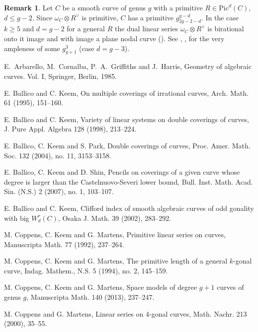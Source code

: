 \documentclass{amsart}
\theoremstyle{plain}
\theoremstyle{definition}
\newtheorem{remark}{Remark}
\begin{document}
\begin{remark}
Let $C$ be a smooth curve of genus $g$ with a primitive $R\in \mathrm{Pic}^d({C})$, $d\le g-2$. Since $\omega _C\otimes R^\vee$ is primitive, $C$ has a primitive $g^{g-d}_{2g-2-d}$.
In the case $k\ge 5$ and $d=g-2$ for a general $R$ the dual linear series $\omega _C\otimes R^\vee$ is birational onto it image and with image a plane nodal curve
(\cite[Proposition II.0]{v}). See \cite{m1}, \cite{mp}, \cite{ckm2} for
the very ampleness of some $g^3_{g+1}$ (case $d=g-3$).
\end{remark}

\providecommand{\bysame}{\leavevmode\hbox to3em{\hrulefill}\thinspace}

\begin{thebibliography}{99}

 E.~Arbarello, M.~Cornalba, P.~A.~Griffiths and J.~Harris,
Geometry of algebraic curves. Vol. I, Springer, Berlin, 1985.


 E. Ballico and C. Keem, On multiple coverings of irrational curves, Arch. Math. 61 (1995), 151--160.

 E. Ballico and C. Keem, Variety of linear systems on double coverings of curves, J. Pure Appl. Algebra 128 (1998), 213--224.

 E. Ballico, C. Keem and S. Park, Double coverings of curves, Proc. Amer. Math. Soc. 132 (2004), no. 11, 3153--3158.


 E. Ballico, C. Keem and D. Shin, Pencils on coverings of a given curve whose degree is larger than the Castelnuovo-Severi lower bound,
Bull. Inst. Math. Acad. Sin. (N.S.) 2 (2007), no. 1, 103--107.


 E. Ballico and C. Keem, Clifford index of smooth algebraic curves of odd gonality with big $W^r_d({C})$, Osaka J. Math.
39 (2002), 283--292.


 M. Coppens, C. Keem and G. Martens, Primitive linear series on curves, Manuscripta Math. 77 (1992), 237--264.

 M. Coppens, C. Keem and G. Martens, The primitive length of a general $k$-gonal curve, Indag. Mathem., N.S. 5 (1994), no. 2, 145--159.

 M. Coppens, C. Keem and G. Martens,  Space models of degree $g+1$ curves of genus $g$, Manuscripta Math. 140 (2013), 237--247.


 M. Coppens and G. Martens, Linear series on 4-gonal curves,
Math. Nachr. 213 (2000), 35--55. 



\end{thebibliography}
\end{document}
